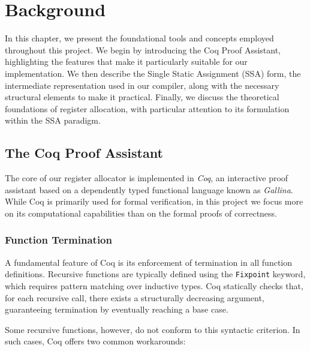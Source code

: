 
\chapter{Background}
\label{cha:background}

In this chapter, we present the foundational tools and concepts employed throughout this project. We begin by introducing the Coq Proof Assistant, highlighting the features that make it particularly suitable for our implementation. We then describe the Single Static Assignment (SSA) form, the intermediate representation used in our compiler, along with the necessary structural elements to make it practical. Finally, we discuss the theoretical foundations of register allocation, with particular attention to its formulation within the SSA paradigm.

\section{The Coq Proof Assistant}

The core of our register allocator is implemented in \textit{Coq}, an interactive proof assistant based on a dependently typed functional language known as \textit{Gallina}. While Coq is primarily used for formal verification, in this project we focus more on its computational capabilities than on the formal proofs of correctness.

\subsection{Function Termination}
\label{subsec:funterm}

A fundamental feature of Coq is its enforcement of termination in all function definitions. Recursive functions are typically defined using the \texttt{Fixpoint} keyword, which requires pattern matching over inductive types. Coq statically checks that, for each recursive call, there exists a structurally decreasing argument, guaranteeing termination by eventually reaching a base case.

Some recursive functions, however, do not conform to this syntactic criterion. In such cases, Coq offers two common workarounds:

